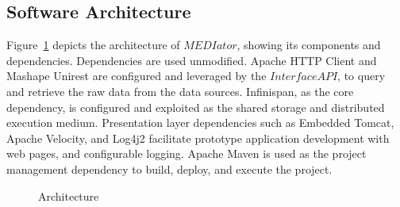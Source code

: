 \documentclass[conference]{IEEEtran}
\begin{document}
\subsection{Software Architecture}
Figure~\ref{fig:arch} depicts the architecture of $MEDIator$, showing its components and dependencies. Dependencies are used unmodified. Apache HTTP Client and Mashape Unirest are configured and leveraged by the $InterfaceAPI$, to query and retrieve the raw data from the data sources. Infinispan, as the core dependency, is configured and exploited as the shared storage and distributed execution medium. Presentation layer dependencies such as Embedded Tomcat, Apache Velocity, and Log4j2 facilitate prototype application development with web pages, and configurable logging. Apache Maven is used as the project management dependency to build, deploy, and execute the project.
\begin{figure}[!htbp]
\begin{center}
\end{center}
  \vspace{-18pt}
  
 \caption{Architecture}
 \label{fig:arch}
 \vspace{-13pt}
 
\end{figure}
\end{document}
